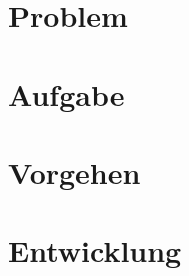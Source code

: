 %
%
%


\begin{frame}
\titlepage
\end{frame}

\section{Problem}

\section{Aufgabe}
	
\section{Vorgehen}
	
\section{Entwicklung}
	